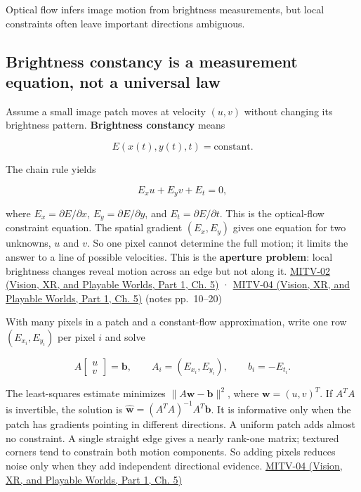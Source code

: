 Optical flow infers image motion from brightness measurements, but local constraints often leave important directions ambiguous.

\subsection{Brightness constancy is a measurement equation, not a universal law}\label{04-visual-computing-ii-ch030-brightness-constancy-is-a-measurement-equation-not-a-universal-law}

\hypertarget{04-visual-computing-ii-ch030-brightness-constancy-is-a-measurement-equation-not-a-universal-law}{}

Assume a small image patch moves at velocity \((u,v)\) without changing its brightness pattern. \textbf{Brightness constancy} means

\[
E(x(t),y(t),t)=\text{constant}.
\]

The chain rule yields

\[
E_xu+E_yv+E_t=0,
\]

where \(E_x=\partial E/\partial x\), \(E_y=\partial E/\partial y\), and \(E_t=\partial E/\partial t\). This is the optical-flow constraint equation. The spatial gradient \((E_x,E_y)\) gives one equation for two unknowns, \(u\) and \(v\). So one pixel cannot determine the full motion; it limits the answer to a line of possible velocities. This is the \textbf{aperture problem}: local brightness changes reveal motion across an edge but not along it. \href{../07-Vision-XR-and-Playable-Worlds-P01/main.pdf\#nameddest=04-visual-computing-ii-ch036-mitv-02---image-formation-perspective-projection-time-derivative-motion-field}{MITV-02 (Vision, XR, and Playable Worlds, Part 1, Ch. 5)} · \href{../07-Vision-XR-and-Playable-Worlds-P01/main.pdf\#nameddest=04-visual-computing-ii-ch036-mitv-04---fixed-optical-flow-optical-mouse-constant-brightness-assumption-closed-form-solution}{MITV-04 (Vision, XR, and Playable Worlds, Part 1, Ch. 5)} (notes pp.~10--20)

With many pixels in a patch and a constant-flow approximation, write one row \((E_{x_i},E_{y_i})\) per pixel \(i\) and solve

\[
A\begin{bmatrix}u\\v\end{bmatrix}=\mathbf{b},\qquad A_i=(E_{x_i},E_{y_i}),\qquad b_i=-E_{t_i}.
\]

The least-squares estimate minimizes \(\|A\mathbf{w}-\mathbf{b}\|^2\), where \(\mathbf{w}=(u,v)^T\). If \(A^TA\) is invertible, the solution is \(\hat{\mathbf{w}}=(A^TA)^{-1}A^T\mathbf{b}\). It is informative only when the patch has gradients pointing in different directions. A uniform patch adds almost no constraint. A single straight edge gives a nearly rank-one matrix; textured corners tend to constrain both motion components. So adding pixels reduces noise only when they add independent directional evidence. \href{../07-Vision-XR-and-Playable-Worlds-P01/main.pdf\#nameddest=04-visual-computing-ii-ch036-mitv-04---fixed-optical-flow-optical-mouse-constant-brightness-assumption-closed-form-solution}{MITV-04 (Vision, XR, and Playable Worlds, Part 1, Ch. 5)}

